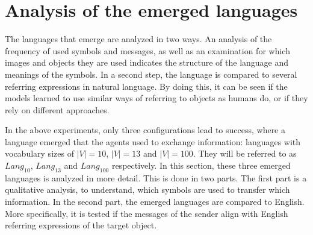 \section{Analysis of the emerged languages}
\label{sec:analysis_language}
The languages that emerge are analyzed in two ways.
An analysis of the frequency of used symbols and messages, as well as an examination for which images and objects they are used indicates the structure of the language and meanings of the symbols.
In a second step, the language is compared to several referring expressions in natural language.
By doing this, it can be seen if the models learned to use similar ways of referring to objects as humans do, or if they rely on different approaches.


In the above experiments, only three configurations lead to success, where a language emerged that the agents used to exchange information: languages with vocabulary sizes of $|V| = 10$, $|V| = 13$ and $|V| = 100$.
They will be referred to as $Lang_{10}$, $Lang_{13}$ and $Lang_{100}$ respectively.
In this section, these three emerged languages is analyzed in more detail.
This is done in two parts.
The first part is a qualitative analysis, to understand, which symbols are used to transfer which information.
In the second part, the emerged languages are compared to English.
More specifically, it is tested if the messages of the sender align with English referring expressions of the target object.

